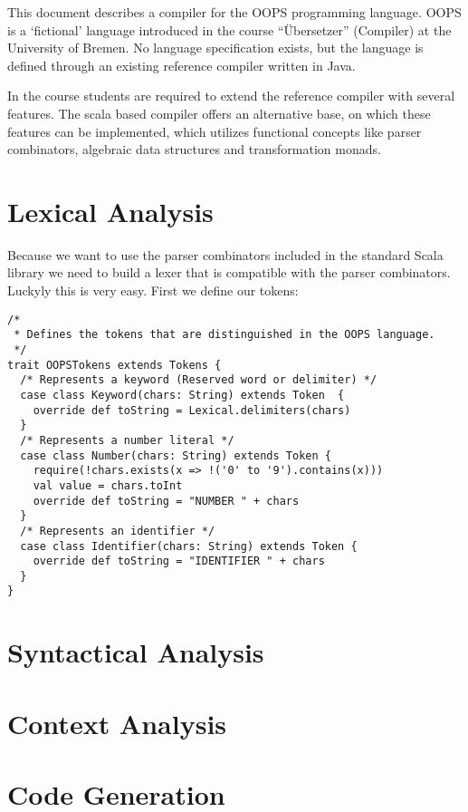 \documentclass{style}
\begin{document}
\maketitle


This document describes a compiler for the OOPS programming language. OOPS is a `fictional' language introduced in the course ``Übersetzer'' (Compiler) at the University of Bremen. No language specification exists, but the language is defined through an existing reference compiler written in Java.

In the course students are required to extend the reference compiler with several features. The scala based compiler offers an alternative base, on which these features can be implemented, which utilizes functional concepts like parser combinators, algebraic data structures and transformation monads.      
 
\section{Lexical Analysis}

Because we want to use the parser combinators included in the standard Scala library we need to build a lexer that is compatible with the parser combinators. Luckyly this is very easy. First we define our tokens:

\begin{lstlisting}[caption={Tokens.scala}, label={lst:tokens}]
/*
 * Defines the tokens that are distinguished in the OOPS language.
 */
trait OOPSTokens extends Tokens {
  /* Represents a keyword (Reserved word or delimiter) */
  case class Keyword(chars: String) extends Token  {
    override def toString = Lexical.delimiters(chars)
  }
  /* Represents a number literal */
  case class Number(chars: String) extends Token {
    require(!chars.exists(x => !('0' to '9').contains(x)))
    val value = chars.toInt
    override def toString = "NUMBER " + chars
  }
  /* Represents an identifier */
  case class Identifier(chars: String) extends Token {
    override def toString = "IDENTIFIER " + chars
  }
}
\end{lstlisting}



\section{Syntactical Analysis}


\section{Context Analysis}


\section{Code Generation}
\end{document}
